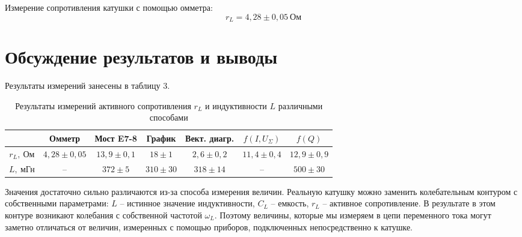 Измерение сопротивления катушки с
помощью омметра:
\[
    r_L = 4,28 \pm 0,05 \ \text{Ом}
\]


\section{Обсуждение результатов и выводы}
Результаты измерений занесены в таблицу
3.
\begin{table}[H]
    \begin{tabular}{|c|c|c|c|c|c|c|}
        \hline
        & Омметр & Мост E7-8 & График &
        Вект. диагр. & $f(I, U_\Sigma)$
                     & $f(Q)$ \\ \hline
        $r_L, \ \text{Ом}$ & $4,28\pm
        0,05$ & $13,9 \pm 0,1$ & $18
        \pm 1$ & $2,6 \pm 0,2$ & $11,4 \pm
        0,4$ & $12,9\pm 0,9$ \\ \hline
        $L, \ \text{мГн}$ & -- & $372 \pm 5$ & $310 \pm
        30$ & $318 \pm 14$ & -- & $500
        \pm 30$ \\ \hline
    \end{tabular}
    \captionsetup{justification =
    centering}
    \caption { Результаты измерений
    активного сопротивления $r_L$ и
индуктивности $L$ различными способами}
\end{table}

Значения достаточно сильно различаются из-за способа измерения
величин. Реальную катушку можно
заменить колебательным контуром с
собственными параметрами: $L$ --
истинное значение индуктивности, $C_L$
-- емкость, $r_L$ -- активное
сопротивление. В результате в этом
контуре возникают колебания с
собственной частотой $\omega_L$. Поэтому
величины, которые мы измеряем в цепи
переменного тока могут заметно
отличаться от величин,
измеренных с помощью приборов,
подключенных непосредственно к катушке.



